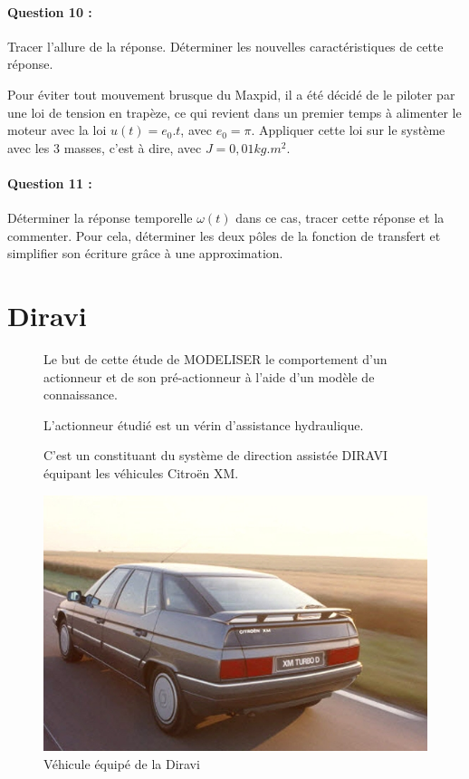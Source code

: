 \paragraph{Question 10 :} Tracer l'allure de la réponse. Déterminer les nouvelles caractéristiques de cette réponse.

Pour éviter tout mouvement brusque du Maxpid, il a été décidé de le piloter par une loi de tension en trapèze, ce qui revient dans un premier temps à alimenter le moteur avec la loi $u(t)=e_0.t$, avec $e_0=\pi$. Appliquer cette loi sur le système avec les 3 masses, c'est à dire, avec $J=0,01kg.m^2$.

\paragraph{Question 11 :} Déterminer la réponse temporelle $\omega(t)$ dans ce cas, tracer cette réponse et la commenter. Pour cela, déterminer les deux pôles de la fonction de transfert et simplifier son écriture grâce à une approximation.

\newpage

\section{Diravi}

\begin{figure}[!h]
\begin{minipage}{0.45\linewidth}
Le but de cette étude de MODELISER le comportement d'un actionneur et de son pré-actionneur à l'aide d'un
modèle de connaissance.

L'actionneur étudié est un vérin d'assistance hydraulique.

C'est un constituant du système de direction assistée DIRAVI équipant les véhicules Citroën XM.
\end{minipage}
\hfill
\begin{minipage}{0.5\linewidth}
 \centering\includegraphics[width=0.7\linewidth]{img/diravi1.jpg}
  \caption{Véhicule équipé de la Diravi}
 \label{diravi1}
\end{minipage}
\end{figure}

